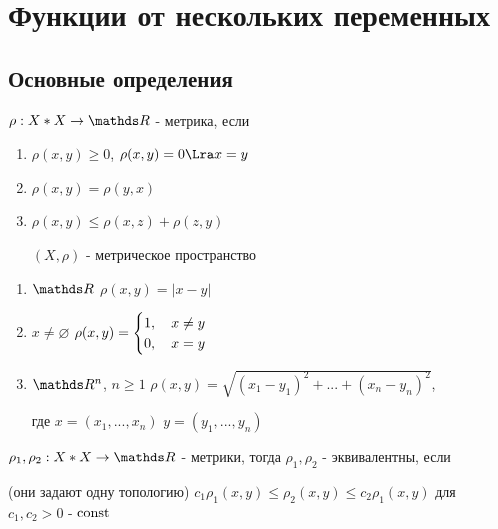 \documentclass[main]{subfiles}
\begin{document}
    \section{Функции от нескольких переменных}
    \subsection{Основные определения}

    \begin{definition}
        $\rho: X * X \ra \R$ - метрика, если
        \begin{enumerate}
          \item $\rho(x,y) \geqslant 0$, $\rho(x,y)=0 \Lra x=y$
          \item $\rho(x,y)=\rho(y,x)$
          \item $\rho(x,y) \leqslant \rho(x,z)+\rho(z,y)$

          $(X,\rho)$ - метрическое пространство
      \end{enumerate}
    \end{definition}

    \begin{examples}
        \begin{enumerate}
            \item $\R$ $\rho(x,y)=|x-y|$
            \item $x \neq \varnothing$ $\rho(x,y)=
                \begin{cases}
                    1, \quad x \neq y\\
                    0, \quad x=y
                \end{cases}$
            \item $\R^n$, $n \geqslant 1$ $\rho(x,y)=\sqrt{(x_1-y_1)^2+...+(x_n-y_n)^2}$,

            где $x=(x_1,...,x_n)$ $y=(y_1,...,y_n)$
        \end{enumerate}
    \end{examples}

    \begin{definition}
        $\rho_1, \rho_2: X*X \ra \R$ - метрики, тогда $\rho_1, \rho_2$ - эквивалентны, если

        (они задают одну топологию) $c_1 \rho_1 (x,y) \leqslant \rho_2 (x,y) \leqslant c_2 \rho_1(x,y)$ для $c_1,c_2>0$ - $\mathop{\rm const}\nolimits$
    \end{definition}
\end{document}

